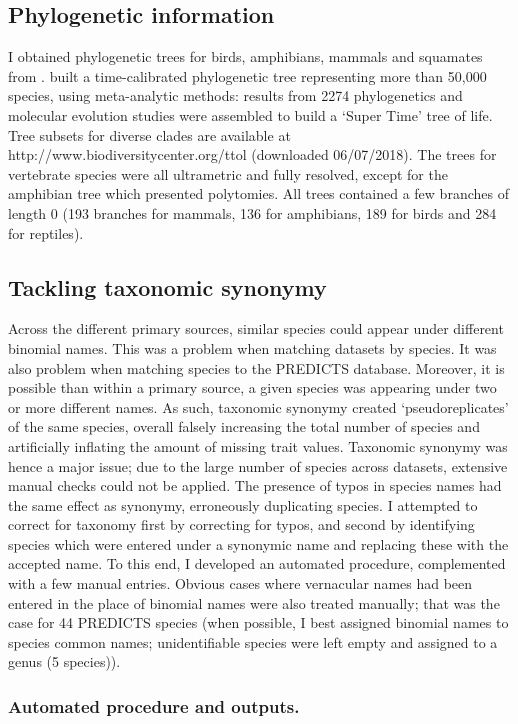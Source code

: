 \subsection{Phylogenetic information}
I obtained phylogenetic trees for birds, amphibians, mammals and squamates from \cite{Hedges2015}. \cite{Hedges2015} built a time-calibrated phylogenetic tree representing more than 50,000 species, using meta-analytic methods: results from 2274 phylogenetics and molecular evolution studies were assembled to build a `Super Time' tree of life. Tree subsets for diverse clades are available at http://www.biodiversitycenter.org/ttol (downloaded 06/07/2018). The trees for vertebrate species were all ultrametric and fully resolved, except for the amphibian tree which presented polytomies. All trees contained a few branches of length 0 (193 branches for mammals, 136 for amphibians, 189 for birds and 284 for reptiles).
\subsection{Tackling taxonomic synonymy}
Across the different primary sources, similar species could appear under different binomial names. This was a problem when matching datasets by species. It was also problem when matching species to the PREDICTS database. Moreover, it is possible than within a primary source, a given species was appearing under two or more different names. As such, taxonomic synonymy created `pseudoreplicates' of the same species, overall falsely increasing the total number of species and artificially inflating the amount of missing trait values. Taxonomic synonymy was hence a major issue; due to the large number of species across datasets, extensive manual checks could not be applied. The presence of typos in species names had the same effect as synonymy, erroneously duplicating species. I attempted to correct for taxonomy first by correcting for typos, and second by identifying species which were entered under a synonymic name and replacing these with the accepted name. To this end, I developed an automated procedure, complemented with a few manual entries. Obvious cases where vernacular names had been entered in the place of binomial names were also treated manually; that was the case for 44 PREDICTS species (when possible, I best assigned binomial names to species common names; unidentifiable species were left empty and assigned to a genus (5 species)).

\subsubsection{Automated procedure and outputs.}
